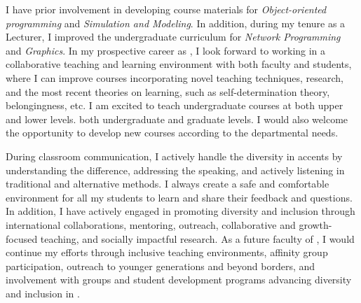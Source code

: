\documentclass[10pt]{article}
\renewcommand*\paragraph[1]{}
\begin{document}
\paragraph{curriculum development for lecture and lab courses in Computer Science/Data Science}
I have prior involvement in developing course materials for \textit{Object-oriented programming} and \textit{Simulation and Modeling}. In addition, during my tenure as a Lecturer, I improved the undergraduate curriculum for \textit{Network Programming} and \textit{Graphics}.
In my prospective career as \PositionName{}, I look forward to working in a collaborative teaching and learning environment with both faculty and students, where I can improve courses incorporating novel teaching  techniques, research, and the most recent theories on learning, such as self-determination theory, belongingness, etc. 
I am excited to teach 
\ifx\degreeLevel\undefined 
undergraduate
\fi
courses at 
\ifx\degreeLevel\undefined 
both upper and lower levels.
\else
both undergraduate and graduate levels.
\fi
I would also welcome the opportunity to develop new courses according to the departmental needs.

\paragraph{P4) The ability to contribute through teaching and/or service to the diversity, cultural sensitivity, and excellence of the academic community.}
\paragraph{Diversity}
During classroom communication, I actively handle the diversity in accents by understanding the difference, addressing the speaking, and actively listening in traditional and alternative methods.
I always create a safe and comfortable environment for all my students to learn and share their feedback and questions. In addition, I have actively engaged in promoting diversity and inclusion through international collaborations, mentoring, outreach, collaborative and growth-focused teaching, and socially impactful research. As a future faculty of \ifx\shortInstitutionName\undefined \InstitutionName \else \shortInstitutionName \fi, I would continue my efforts through inclusive teaching environments, affinity group participation, outreach to younger generations and beyond borders, and involvement with groups and student development programs advancing diversity and inclusion in \ifx\shortInstitutionName\undefined \InstitutionName \else \shortInstitutionName \fi.
\end{document}
